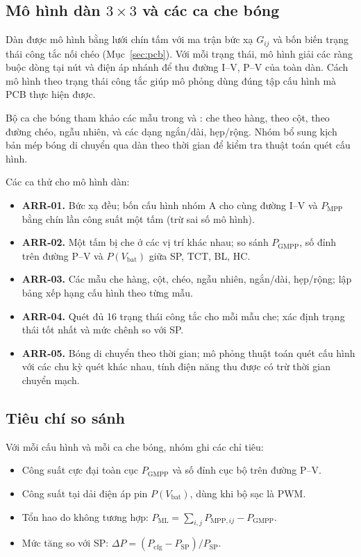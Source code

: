\subsection{Mô hình dàn \texorpdfstring{\(3\times3\)}{3x3} và các ca che bóng}
\label{sec:array-simulation}

Dàn được mô hình bằng lưới chín tấm với ma trận bức xạ \(G_{ij}\) và bốn biến trạng thái công tắc nối chéo (Mục~\ref{sec:pcb}). Với mỗi trạng thái, mô hình giải các ràng buộc dòng tại nút và điện áp nhánh để thu đường I--V, P--V của toàn dàn. Cách mô hình theo trạng thái công tắc giúp mô phỏng dùng đúng tập cấu hình mà PCB thực hiện được.

Bộ ca che bóng tham khảo các mẫu trong \cite{etarhouni} và \cite{alwar}: che theo hàng, theo cột, theo đường chéo, ngẫu nhiên, và các dạng ngắn/dài, hẹp/rộng. Nhóm bổ sung kịch bản mép bóng di chuyển qua dàn theo thời gian để kiểm tra thuật toán quét cấu hình.

Các ca thử cho mô hình dàn:

\begin{itemize}
    \item \textbf{ARR-01.} Bức xạ đều; bốn cấu hình nhóm A cho cùng đường I--V và \(P_{\mathrm{MPP}}\) bằng chín lần công suất một tấm (trừ sai số mô hình).
    \item \textbf{ARR-02.} Một tấm bị che ở các vị trí khác nhau; so sánh \(P_{\mathrm{GMPP}}\), số đỉnh trên đường P--V và \(P(V_{\mathrm{bat}})\) giữa SP, TCT, BL, HC.
    \item \textbf{ARR-03.} Các mẫu che hàng, cột, chéo, ngẫu nhiên, ngắn/dài, hẹp/rộng; lập bảng xếp hạng cấu hình theo từng mẫu.
    \item \textbf{ARR-04.} Quét đủ 16 trạng thái công tắc cho mỗi mẫu che; xác định trạng thái tốt nhất và mức chênh so với SP.
    \item \textbf{ARR-05.} Bóng di chuyển theo thời gian; mô phỏng thuật toán quét cấu hình với các chu kỳ quét khác nhau, tính điện năng thu được có trừ thời gian chuyển mạch.
\end{itemize}

\subsection{Tiêu chí so sánh}

Với mỗi cấu hình và mỗi ca che bóng, nhóm ghi các chỉ tiêu:

\begin{itemize}
    \item Công suất cực đại toàn cục \(P_{\mathrm{GMPP}}\) và số đỉnh cục bộ trên đường P--V.
    \item Công suất tại dải điện áp pin \(P(V_{\mathrm{bat}})\), dùng khi bộ sạc là PWM.
    \item Tổn hao do không tương hợp: \(P_{\mathrm{ML}}=\sum_{i,j}P_{\mathrm{MPP},ij}-P_{\mathrm{GMPP}}\).
    \item Mức tăng so với SP: \(\Delta P=(P_{\mathrm{cfg}}-P_{\mathrm{SP}})/P_{\mathrm{SP}}\).
\end{itemize}

